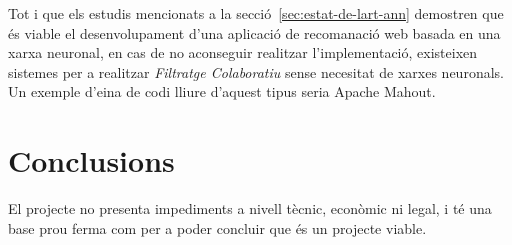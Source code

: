 Tot i que els estudis mencionats a la secció~\ref{sec:estat-de-lart-ann} demostren que és viable el desenvolupament d'una aplicació de recomanació web basada en una xarxa neuronal, en cas de no aconseguir realitzar l'implementació, existeixen sistemes per a realitzar \emph{Filtratge Colaboratiu}\cite{collaborative-filtering} sense necesitat de xarxes neuronals. Un exemple d'eina de codi lliure d'aquest tipus seria Apache Mahout\cite{Apache-Mahout}.

\section{Conclusions}

El projecte no presenta impediments a nivell tècnic, econòmic ni legal, i té una base prou ferma com per a poder concluir que és un projecte viable.